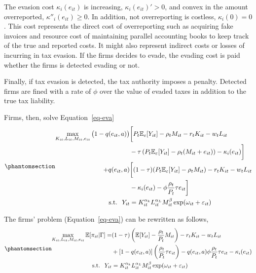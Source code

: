 \documentclass[
  12pt]{article}
\theoremstyle{definition}
\theoremstyle{remark}
\begin{document}
The evasion cost \(\kappa_i(e_{it})\) is increasing,
\(\kappa_i(e_{it})'>0\), and convex in the amount overreported,
\(\kappa''_i(e_{it})\ge0\). In addition, not overreporting is costless,
\(\kappa_i(0)=0\). This cost represents the direct cost of overreporting
such as acquiring fake invoices and resource cost of maintaining
parallel accounting books to keep track of the true and reported costs.
It might also represent indirect costs or losses of incurring in tax
evasion. If the firms decides to evade, the evading cost is paid whether
the firms is detected evading or not.

Finally, if tax evasion is detected, the tax authority imposes a
penalty. Detected firms are fined with a rate of \(\phi\) over the value
of evaded taxes in addition to the true tax liability.

Firms, then, solve Equation~\ref{eq-eva}
\begin{equation}\phantomsection\label{eq-eva}{
\begin{aligned}
  \max_{K_{it},L_{it},M_{it}, e_{it}} \big(1-q(e_{it},a)\big)&\bigg[P_t\mathbb{E}_{\varepsilon}[Y_{it}]-\rho_{t} M_{it}-r_tK_{it}-w_tL_{it}\\
  &-\tau\left(P_t\mathbb{E}_{\varepsilon}[Y_{it}]-\rho_{t} (M_{it}+e_{it})\right)-\kappa_i(e_{it})\bigg]\\
  +q(e_{it},a)&\bigg[(1-\tau)(P_t\mathbb{E}_{\varepsilon}[Y_{it}]-\rho_{t} M_{it})-r_tK_{it}-w_tL_{it}\\
  &-\kappa_i(e_{it})-\phi\frac{\rho_t}{P_t}\tau e_{it}\bigg] \\
  \text{s.t. }\; Y_{it}&=K_{it}^{\alpha_k}L_{it}^{\alpha_L}M_{it}^{\beta}\exp(\omega_{it}+\varepsilon_{it})
\end{aligned}
}\end{equation}

The firms' problem (Equation~\ref{eq-eva}) can be rewritten as follows,
\begin{equation}\phantomsection\label{eq-eva-2}{
\begin{aligned}
  \max_{K_{it}, L_{it},M_{it},e_{it}} \mathbb{E}[\pi_{it}|\Gamma] = &(1-\tau)\left(\mathbb{E}[Y_{it}]-\frac{\rho_{t}}{P_t} M_{it}\right)-r_tK_{it}-w_tL_{it}\\
  &+[1-q(e_{it}, a)]\left(\frac{\rho_{t}}{P_t}\tau e_{it}\right)
  -q(e_{it},a)\phi\frac{\rho_t}{P_t}\tau e_{it}-\kappa_i(e_{it}) \\
  \text{s.t. }\; Y_{it}&=K_{it}^{\alpha_k}L_{it}^{\alpha_L}M_{it}^{\beta}\exp(\omega_{it}+\varepsilon_{it})
\end{aligned}
}\end{equation}
\end{document}
